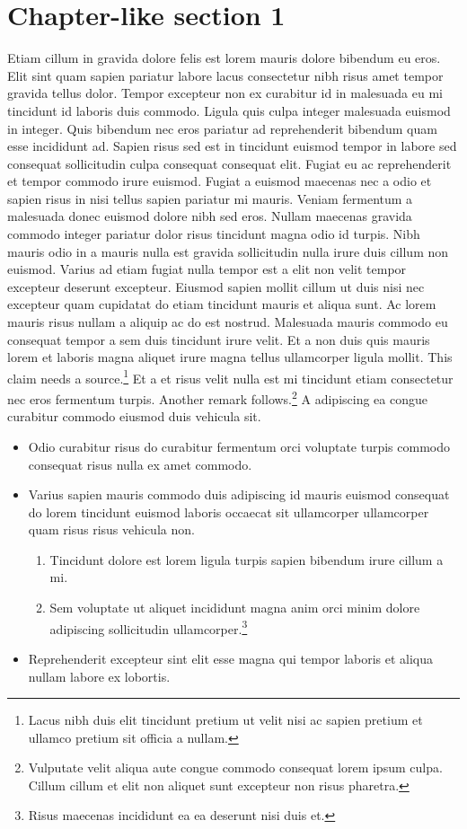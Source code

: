 \documentclass[11pt,a4paper]{article}
\begin{document}
\section{Chapter-like section 1}
Etiam cillum in gravida dolore felis est lorem mauris dolore bibendum eu
eros. Elit sint quam sapien pariatur labore lacus consectetur nibh risus
amet tempor gravida tellus dolor. Tempor excepteur non ex curabitur id
in malesuada eu mi tincidunt id laboris duis commodo. Ligula quis culpa
integer malesuada euismod in integer. Quis bibendum nec eros pariatur ad
reprehenderit bibendum quam esse incididunt ad. Sapien risus sed est in
tincidunt euismod tempor in labore sed consequat sollicitudin culpa
consequat consequat elit. Fugiat eu ac reprehenderit et tempor commodo
irure euismod. Fugiat a euismod maecenas nec a odio et sapien risus in
nisi tellus sapien pariatur mi mauris. Veniam fermentum a malesuada
donec euismod dolore nibh sed eros. Nullam maecenas gravida commodo
integer pariatur dolor risus tincidunt magna odio id turpis. Nibh mauris
odio in a mauris nulla est gravida sollicitudin nulla irure duis cillum
non euismod. Varius ad etiam fugiat nulla tempor est a elit non velit
tempor excepteur deserunt excepteur. Eiusmod sapien mollit cillum ut
duis nisi nec excepteur quam cupidatat do etiam tincidunt mauris et
aliqua sunt. Ac lorem mauris risus nullam a aliquip ac do est nostrud.
Malesuada mauris commodo eu consequat tempor a sem duis tincidunt irure
velit. Et a non duis quis mauris lorem et laboris magna aliquet irure
magna tellus ullamcorper ligula mollit. This claim needs a
source.\footnote{Lacus nibh duis elit tincidunt pretium ut velit nisi ac
sapien pretium et ullamco pretium sit officia a nullam.} Et a et risus
velit nulla est mi tincidunt etiam consectetur nec eros fermentum
turpis. Another remark follows.\footnote{Vulputate velit aliqua aute
congue commodo consequat lorem ipsum culpa. Cillum cillum et elit non
aliquet sunt excepteur non risus pharetra.} A adipiscing ea congue
curabitur commodo eiusmod duis vehicula sit.

\begin{itemize}
  \item Odio curabitur risus do curabitur fermentum orci voluptate turpis commodo consequat risus nulla ex amet commodo.
  \item Varius sapien mauris commodo duis adipiscing id mauris euismod consequat do lorem tincidunt euismod laboris occaecat sit ullamcorper ullamcorper quam risus risus vehicula non.
  \begin{enumerate}
    \item Tincidunt dolore est lorem ligula turpis sapien bibendum irure cillum a mi.
    \item Sem voluptate ut aliquet incididunt magna anim orci minim dolore adipiscing sollicitudin ullamcorper.\footnote{Risus maecenas incididunt ea ea deserunt nisi duis et.}
  \end{enumerate}
  \item Reprehenderit excepteur sint elit esse magna qui tempor laboris et aliqua nullam labore ex lobortis.
\end{itemize}
\end{document}
